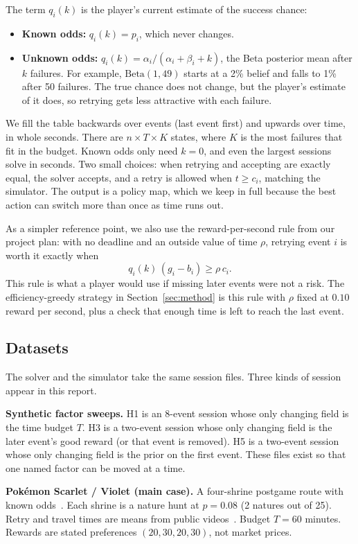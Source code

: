 \documentclass[11pt,a4paper]{article}
\newcommand{\who}[1]{}
\begin{document}
The term $q_i(k)$ is the player's current estimate of the success chance:
\begin{itemize}
\item \textbf{Known odds:} $q_i(k) = p_i$, which never changes.
\item \textbf{Unknown odds:} $q_i(k) = \alpha_i / (\alpha_i + \beta_i + k)$, the Beta posterior mean after $k$ failures. For example, $\mathrm{Beta}(1,49)$ starts at a 2\% belief and falls to 1\% after 50 failures. The true chance does not change, but the player's estimate of it does, so retrying gets less attractive with each failure.
\end{itemize}

We fill the table backwards over events (last event first) and upwards over time, in whole seconds. There are $n \times T \times K$ states, where $K$ is the most failures that fit in the budget. Known odds only need $k = 0$, and even the largest sessions solve in seconds. Two small choices: when retrying and accepting are exactly equal, the solver accepts, and a retry is allowed when $t \ge c_i$, matching the simulator. The output is a policy map, which we keep in full because the best action can switch more than once as time runs out.

As a simpler reference point, we also use the reward-per-second rule from our project plan: with no deadline and an outside value of time $\rho$, retrying event $i$ is worth it exactly when
\[
q_i(k)\,(g_i - b_i) \ge \rho\, c_i.
\]
This rule is what a player would use if missing later events were not a risk. The efficiency-greedy strategy in Section~\ref{sec:method} is this rule with $\rho$ fixed at $0.10$ reward per second, plus a check that enough time is left to reach the last event.

\subsection{Datasets\who{Yera}}
The solver and the simulator take the same session files. Three kinds of session appear in this report.

\textbf{Synthetic factor sweeps.} H1 is an 8-event session whose only changing field is the time budget $T$. H3 is a two-event session whose only changing field is the later event's good reward (or that event is removed). H5 is a two-event session whose only changing field is the prior on the first event. These files exist so that one named factor can be moved at a time.

\textbf{Pok\'emon Scarlet / Violet (main case).} A four-shrine postgame route with known odds~\cite{pokemon_encounters}. Each shrine is a nature hunt at $p = 0.08$ (2 natures out of 25). Retry and travel times are means from public videos~\cite{pokemon_timings}. Budget $T = 60$ minutes. Rewards are stated preferences $(20, 30, 20, 30)$, not market prices.
\end{document}
